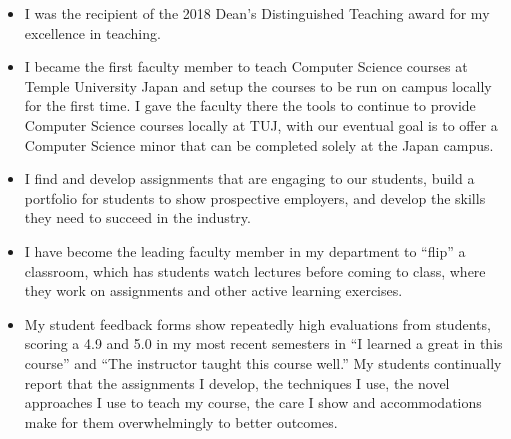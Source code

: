 \documentclass[10pt]{article}
\begin{document}
\begin{itemize}
	\item I was the recipient of the 2018 Dean’s Distinguished Teaching award for my excellence in teaching.
	\item I became the first faculty member to teach Computer Science courses at Temple University Japan and setup the courses to be run on campus locally for the first  time.  I gave the faculty there the tools to continue to provide Computer Science courses locally at TUJ, with our eventual goal is to offer a Computer Science minor that can be completed solely at the Japan campus.
	
	\item I find and develop assignments that are engaging to our students, build a portfolio for students to show prospective employers, and develop the skills they need to succeed in the industry.
	
	\item I have become the leading faculty member in my department to ``flip'' a classroom, which has students watch lectures before coming to class, where they work on assignments and other active learning exercises.
	\item My student feedback forms show repeatedly high evaluations from students, scoring a 4.9 and 5.0 in my most recent semesters in ``I learned a great in this course'' and ``The instructor taught this course well.''  My students continually report that the assignments I develop, the techniques I use, the novel approaches I use to teach my course, the care I show and  accommodations make for them overwhelmingly to better outcomes. 


\end{itemize}
\end{document}
